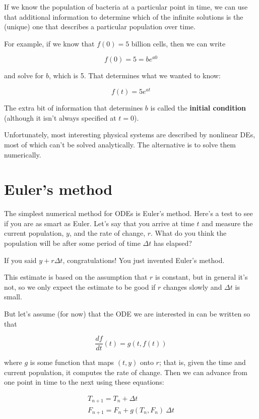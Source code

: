 \documentclass{book}
\begin{document}
If we know the population of bacteria at a particular point in time,
we can use that additional information to determine which of the
infinite solutions is the (unique) one that describes a particular
population over time.

For example, if we know that $f(0) = 5$ billion cells, then we
can write

\[ f(0) = 5 = b e^{a 0} \]

and solve for $b$, which is 5.  That determines what we wanted
to know:

\[ f(t) = 5 e^{at} \]

The extra bit of information that determines $b$ is called
the {\bf initial condition} (although it isn't always specified
at $t=0$).

Unfortunately, most interesting physical systems are described by
nonlinear DEs, most of which can't be solved analytically.  The
alternative is to solve them numerically.


\section{Euler's method}

The simplest numerical method for ODEs is Euler's method.  Here's a
test to see if you are as smart as Euler.  Let's say that you
arrive at time $t$ and measure the current population, $y$, and
the rate of change, $r$.  What do you think the population will
be after some period of time $\Delta t$ has elapsed?

If you said $y + r \Delta t$, congratulations!  You just invented
Euler's method.

This estimate is based on the assumption that $r$ is constant, but
in general it's not, so we only expect the estimate to be good if
$r$ changes slowly and $\Delta t$ is small.

But let's assume (for now) that the ODE we are interested in can
be written so that

\[ \frac{df}{dt}(t) = g(t, f(t)) \]

where $g$ is some function that maps $(t, y)$ onto $r$;
that is, given the time and current population, it computes the rate
of change.  Then we can advance from one point in time to the
next using these equations:

\begin{eqnarray}
\label{euler1}
T_{n+1} = T_n + \Delta t           \\
\label{euler2}
F_{n+1} = F_n + g(T_n,F_n)~\Delta t
\end{eqnarray}
\end{document}
